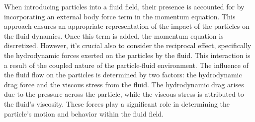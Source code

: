 When introducing particles into a fluid field, their presence is accounted for by incorporating an external body force term in the momentum equation. This approach ensures an appropriate representation of the impact of the particles on the fluid dynamics. Once this term is added, the momentum equation is discretized. However, it's crucial also to consider the reciprocal effect, specifically the hydrodynamic forces exerted on the particles by the fluid. This interaction is a result of the coupled nature of the particle-fluid environment. The influence of the fluid flow on the particles is determined by two factors: the hydrodynamic drag force and the viscous stress from the fluid. The hydrodynamic drag arises due to the pressure across the particle, while the viscous stress is attributed to the fluid's viscosity. These forces play a significant role in determining the particle's motion and behavior within the fluid field.

